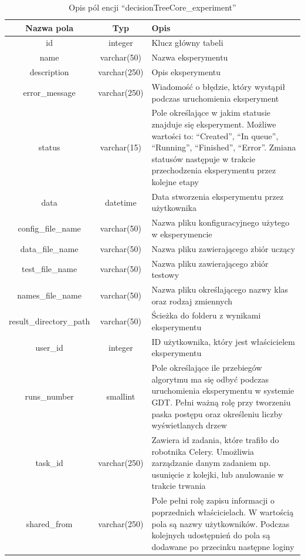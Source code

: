 \begin{table}[htb]
	\caption[Opis pól tabeli \enquote{decisionTreeCore\_experiment}]{ Opis pól encji \enquote{decisionTreeCore\_experiment}}
	\centering
	\begin{tabular}{|c|c|p{9cm}|}
		\hline
		\textbf{Nazwa pola} & \textbf{Typ} & \textbf{Opis} \\\hline
		id & integer & Klucz główny tabeli \\\hline
		name & varchar(50) & Nazwa eksperymentu\\\hline
		description & varchar(250) & Opis eksperymentu\\\hline
		error\_message & varchar(250) & Wiadomość o błędzie, który wystąpił podczas uruchomienia eksperyment\\\hline
		status & varchar(15) & Pole określające w jakim statusie znajduje się eksperyment. Możliwe wartości to: \enquote{Created}, \enquote{In queue}, \enquote{Running}, \enquote{Finished}, \enquote{Error}. Zmiana statusów następuje w trakcie przechodzenia eksperymentu przez kolejne etapy\\\hline
		data & datetime & Data stworzenia eksperymentu przez użytkownika\\\hline
		config\_file\_name & varchar(50) & Nazwa pliku konfiguracyjnego użytego w eksperymencie\\\hline
		data\_file\_name & varchar(50) & Nazwa pliku zawierającego zbiór uczący \\\hline
		test\_file\_name & varchar(50) & Nazwa pliku zawierającego zbiór testowy \\\hline
		names\_file\_name & varchar(50) & Nazwa pliku określającego nazwy klas oraz rodzaj zmiennych \\\hline
		result\_directory\_path & varchar(50) & Ścieżka do folderu z wynikami eksperymentu\\\hline
		user\_id & integer & ID użytkownika, który jest właścicielem eksperymentu \\\hline
		runs\_number & smallint & Pole określające ile przebiegów algorytmu ma się odbyć podczas uruchomienia eksperymentu w systemie GDT. Pełni ważną rolę przy tworzeniu paska postępu oraz określeniu liczby wyświetlanych drzew\\\hline
		task\_id & varchar(250) & Zawiera id zadania, które trafiło do robotnika Celery. Umożliwia zarządzanie danym zadaniem np. usunięcie z kolejki, lub anulowanie w trakcie trwania\\\hline
		shared\_from & varchar(250) & Pole pełni rolę zapisu informacji o poprzednich właścicielach. W wartością pola są nazwy użytkowników. Podczas kolejnych udostępnień do pola są dodawane po przecinku następne loginy  \\\hline
	\end{tabular}
	\label{tabela_1_schema_experiment}
\end{table}

